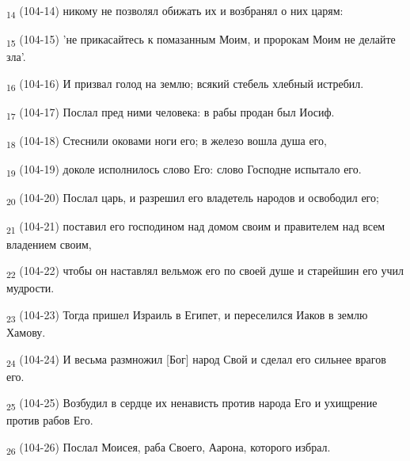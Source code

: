 \begin{tcolorbox}
\textsubscript{14} (104-14) никому не позволял обижать их и возбранял о них царям:
\end{tcolorbox}
\begin{tcolorbox}
\textsubscript{15} (104-15) 'не прикасайтесь к помазанным Моим, и пророкам Моим не делайте зла'.
\end{tcolorbox}
\begin{tcolorbox}
\textsubscript{16} (104-16) И призвал голод на землю; всякий стебель хлебный истребил.
\end{tcolorbox}
\begin{tcolorbox}
\textsubscript{17} (104-17) Послал пред ними человека: в рабы продан был Иосиф.
\end{tcolorbox}
\begin{tcolorbox}
\textsubscript{18} (104-18) Стеснили оковами ноги его; в железо вошла душа его,
\end{tcolorbox}
\begin{tcolorbox}
\textsubscript{19} (104-19) доколе исполнилось слово Его: слово Господне испытало его.
\end{tcolorbox}
\begin{tcolorbox}
\textsubscript{20} (104-20) Послал царь, и разрешил его владетель народов и освободил его;
\end{tcolorbox}
\begin{tcolorbox}
\textsubscript{21} (104-21) поставил его господином над домом своим и правителем над всем владением своим,
\end{tcolorbox}
\begin{tcolorbox}
\textsubscript{22} (104-22) чтобы он наставлял вельмож его по своей душе и старейшин его учил мудрости.
\end{tcolorbox}
\begin{tcolorbox}
\textsubscript{23} (104-23) Тогда пришел Израиль в Египет, и переселился Иаков в землю Хамову.
\end{tcolorbox}
\begin{tcolorbox}
\textsubscript{24} (104-24) И весьма размножил [Бог] народ Свой и сделал его сильнее врагов его.
\end{tcolorbox}
\begin{tcolorbox}
\textsubscript{25} (104-25) Возбудил в сердце их ненависть против народа Его и ухищрение против рабов Его.
\end{tcolorbox}
\begin{tcolorbox}
\textsubscript{26} (104-26) Послал Моисея, раба Своего, Аарона, которого избрал.
\end{tcolorbox}
